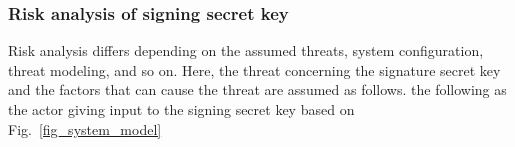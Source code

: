
\subsubsection{Risk analysis of signing secret key}
Risk analysis differs depending on the assumed threats, system
configuration, threat modeling, and so on.
Here,
the threat concerning the signature secret key and the factors that
can cause the threat are assumed as follows.
the following as the actor giving input to the signing secret key
based on Fig.~\ref{fig_system_model}%

